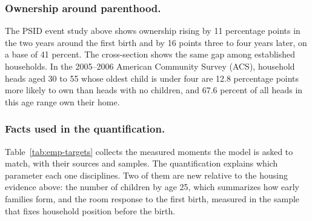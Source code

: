 \subsubsection*{Ownership around parenthood.}
The PSID event study above shows ownership rising by 11 percentage points in
the two years around the first birth and by 16 points three to four years
later, on a base of 41 percent. The cross-section shows the same gap among
established households. In the 2005--2006 American Community Survey (ACS),
household heads aged 30 to 55 whose oldest child is under four are 12.8
percentage points more likely to own than heads with no children, and 67.6
percent of all heads in this age range own their home.

\subsubsection*{Facts used in the quantification.}
Table~\ref{tab:emp-targets} collects the measured moments the model is asked
to match, with their sources and samples. The quantification
explains which parameter each one disciplines. Two of them are new relative to
the housing evidence above: the number of children by age 25, which
summarizes how early families form, and the room response to the first birth,
measured in the sample that fixes household position before the birth.

